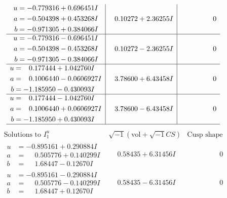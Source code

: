 \documentclass[1p]{elsarticle_modified}
\theoremstyle{definition}
\newcommand{\I}{\sqrt{-1}}
\begin{document}
$$\begin{array}{c|c|c}
\begin{aligned}
u &= -0.779316 + 0.696451 I \\
a &= -0.504398 + 0.453268 I \\
b &= -0.971305 + 0.384066 I\end{aligned}
 & \phantom{-}0.10272 + 2.36255 I & \phantom{-0.000000 } 0 \\ \hline\begin{aligned}
u &= -0.779316 - 0.696451 I \\
a &= -0.504398 - 0.453268 I \\
b &= -0.971305 - 0.384066 I\end{aligned}
 & \phantom{-}0.10272 - 2.36255 I & \phantom{-0.000000 } 0 \\ \hline\begin{aligned}
u &= \phantom{-}0.177444 + 1.042760 I \\
a &= \phantom{-}0.1006440 - 0.0606927 I \\
b &= -1.185950 - 0.430093 I\end{aligned}
 & \phantom{-}3.78600 + 6.43458 I & \phantom{-0.000000 } 0 \\ \hline\begin{aligned}
u &= \phantom{-}0.177444 - 1.042760 I \\
a &= \phantom{-}0.1006440 + 0.0606927 I \\
b &= -1.185950 + 0.430093 I\end{aligned}
 & \phantom{-}3.78600 - 6.43458 I & \phantom{-0.000000 } 0\\
 \hline 
 \end{array}$$\newpage$$\begin{array}{c|c|c}  
\text{Solutions to }I^u_{1}& \I (\text{vol} + \sqrt{-1}CS) & \text{Cusp shape}\\
 \hline 
\begin{aligned}
u &= -0.895161 + 0.290884 I \\
a &= \phantom{-}0.505776 + 0.140299 I \\
b &= \phantom{-}1.68447 - 0.12670 I\end{aligned}
 & \phantom{-}0.58435 + 6.31456 I & \phantom{-0.000000 } 0 \\ \hline\begin{aligned}
u &= -0.895161 - 0.290884 I \\
a &= \phantom{-}0.505776 - 0.140299 I \\
b &= \phantom{-}1.68447 + 0.12670 I\end{aligned}
 & \phantom{-}0.58435 - 6.31456 I & \phantom{-0.000000 } 0 \\ \hline\begin{aligned}

\end{aligned}
\end{array}$$
\end{document}
